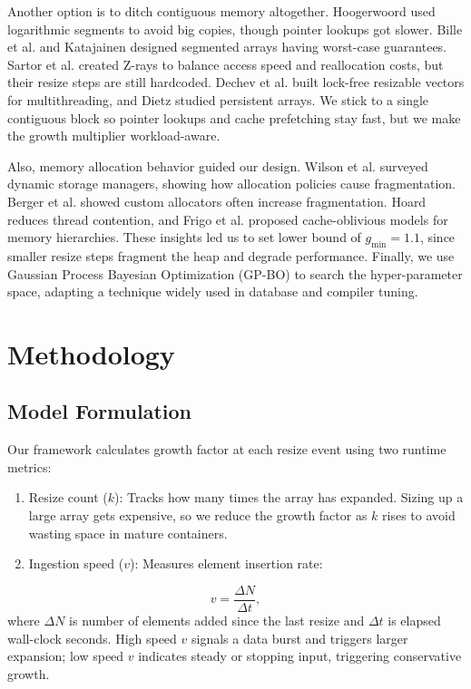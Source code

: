 \documentclass[conference]{IEEEtran}
\begin{document}
Another option is to ditch contiguous memory altogether. Hoogerwoord \cite{logarithmic_arrays} used logarithmic segments to avoid big copies, though pointer lookups got slower. Bille et al. \cite{resizable_optimal_time_space} and Katajainen \cite{fast_array} designed segmented arrays having worst-case guarantees. Sartor et al. \cite{z_rays} created Z-rays to balance access speed and reallocation costs, but their resize steps are still hardcoded. Dechev et al. \cite{lock_free_vector} built lock-free resizable vectors for multithreading, and Dietz \cite{persistent_arrays} studied persistent arrays. We stick to a single contiguous block so pointer lookups and cache prefetching stay fast, but we make the growth multiplier workload-aware.

Also, memory allocation behavior guided our design. Wilson et al. \cite{dynamic_storage_allocation} surveyed dynamic storage managers, showing how allocation policies cause fragmentation. Berger et al. \cite{reconsidering_custom_allocation} showed custom allocators often increase fragmentation. Hoard \cite{hoard_allocator} reduces thread contention, and Frigo et al. \cite{frigo_cache_oblivious} proposed cache-oblivious models for memory hierarchies. These insights led us to set lower bound of $g_{\min} = 1.1$, since smaller resize steps fragment the heap and degrade performance. Finally, we use Gaussian Process Bayesian Optimization (GP-BO) \cite{practical_bayesian_opt, bayesian_opt_review, jones_ego} to search the hyper-parameter space, adapting a technique widely used in database and compiler tuning.

\section{Methodology}
\subsection{Model Formulation}
Our framework calculates growth factor at each resize event using two runtime metrics:
\begin{enumerate}
    \item Resize count ($k$): Tracks how many times the array has expanded. Sizing up a large array gets expensive, so we reduce the growth factor as $k$ rises to avoid wasting space in mature containers.
    \item Ingestion speed ($v$): Measures element insertion rate:
\end{enumerate}
\begin{equation}
    v = \frac{\Delta N}{\Delta t},
\end{equation}
where $\Delta N$ is number of elements added since the last resize and $\Delta t$ is elapsed wall-clock seconds. High speed $v$ signals a data burst and triggers larger expansion; low speed $v$ indicates steady or stopping input, triggering conservative growth.
\end{document}
